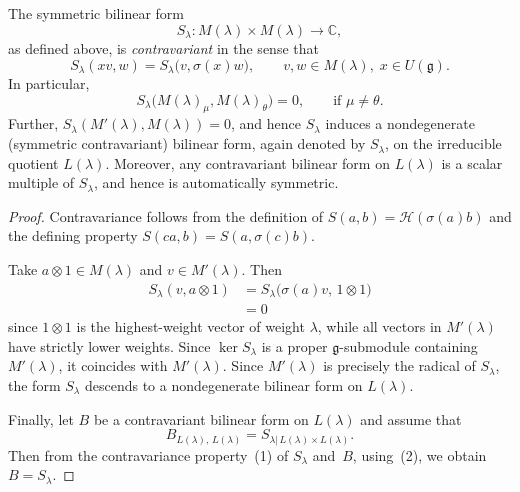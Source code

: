 \documentclass[12pt]{article}
\begin{document}
\begin{proposition}[2.3.2]
The symmetric bilinear form 
\[
S_\lambda : M(\lambda) \times M(\lambda) \longrightarrow \mathbb{C},
\]
as defined above, is \emph{contravariant} in the sense that
\begin{equation}
S_\lambda(xv, w) = S_\lambda\bigl(v, \sigma(x)w\bigr),
\qquad v,w \in M(\lambda),\; x \in U(\mathfrak{g}).
\tag{1}
\end{equation}
In particular,
\begin{equation}
S_\lambda\bigl(M(\lambda)_\mu, M(\lambda)_\theta\bigr) = 0,
\qquad \text{if } \mu \neq \theta.
\tag{2}
\end{equation}
Further, $S_\lambda(M'(\lambda), M(\lambda)) = 0$, and hence $S_\lambda$ induces
a nondegenerate (symmetric contravariant) bilinear form, again denoted by $S_\lambda$,
on the irreducible quotient $L(\lambda)$.
Moreover, any contravariant bilinear form on $L(\lambda)$ is a scalar multiple of $S_\lambda$,
and hence is automatically symmetric.
\end{proposition}

\begin{proof}
Contravariance follows from the definition of $S(a,b) = \mathcal H(\sigma(a)b)$ and the defining property
$S(ca,b) = S(a, \sigma(c)b)$.

Take $a \otimes 1 \in M(\lambda)$ and $v \in M'(\lambda)$.
Then 
\begin{align*}
S_\lambda(v, a \otimes 1) &= S_\lambda\bigl(\sigma(a)v,\, 1 \otimes 1\bigr) \\
&= 0 
\end{align*} since $1 \otimes 1$ is the highest-weight vector of weight $\lambda$, while all vectors in $M'(\lambda)$ have strictly lower weights. Since $\ker S_\lambda$ is a proper $\mathfrak{g}$-submodule containing $M'(\lambda)$, it coincides with $M'(\lambda)$. Since $M'(\lambda)$ is precisely the radical of $S_\lambda$, the form $S_\lambda$ descends to a nondegenerate bilinear form on $L(\lambda)$.

Finally, let $B$ be a contravariant bilinear form on $L(\lambda)$ and assume that
\[
B_{L(\lambda),\, L(\lambda)} = S_{\lambda|\, L(\lambda)\times L(\lambda)}.
\]
Then from the contravariance property~(1) of $S_\lambda$ and~$B$,
using~(2), we obtain $B = S_\lambda$.
\end{proof}
\end{document}
